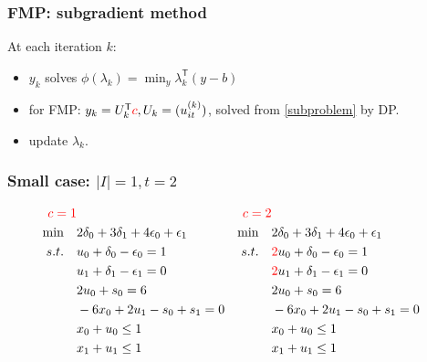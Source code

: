 \begin{frame}
  \frametitle{FMP: subgradient method}
  At each iteration \(k\):
  \begin{itemize}
    \item  \(y_k\) solves \(\phi(\lambda_k) = \min_y \lambda_k^\mathsf{T}(y-b)\)
    \item for FMP: \(y_k = U_k ^\mathsf{T} \textcolor{red}{c}, U_k = (u^{(k)}_{it})\), solved from \eqref{subproblem} by DP.
    \item update \(\lambda_k\).
  \end{itemize}
\end{frame}
\begin{frame}
  \frametitle{Small case: \(|I| = 1, t = 2\) }
  \begin{align*}
    \textcolor{red}{c = 1} &                                                    & \textcolor{red}{c =2}                                                                                \\
    \min \quad             & 2\delta_0 + 3 \delta_1 + 4 \epsilon_0 + \epsilon_1 & \min \quad            & 2\delta_0 + 3 \delta_1 + 4 \epsilon_0 + \epsilon_1                           \\
    s.t. \quad             & u_0 + \delta_0 - \epsilon_0 = 1                    & s.t. \quad            & \textcolor{red}{2}u_0 + \delta_0 - \epsilon_0 = 1                            \\
                           & u_1 + \delta_1 - \epsilon_1 = 0                    &                       & \textcolor{red}{2}u_1 + \delta_1 - \epsilon_1 = 0                            \\
                           & 2 u_0 + s_0 = 6                                    &                       & 2 u_0 + s_0 = 6                                                              \\
                           & - 6 x_0 + 2 u_1 - s_0 + s_1 = 0                    &                       & - 6 x_0 + 2 u_1 - s_0 + s_1 = 0                                              \\
                           & x_0 + u_0 \le 1                                    &                       & x_0 + u_0 \le 1                                                              \\
                           & x_1 + u_1 \le 1                                    &                       & x_1 + u_1 \le 1                                                              \\

\end{align*}
\end{frame}
